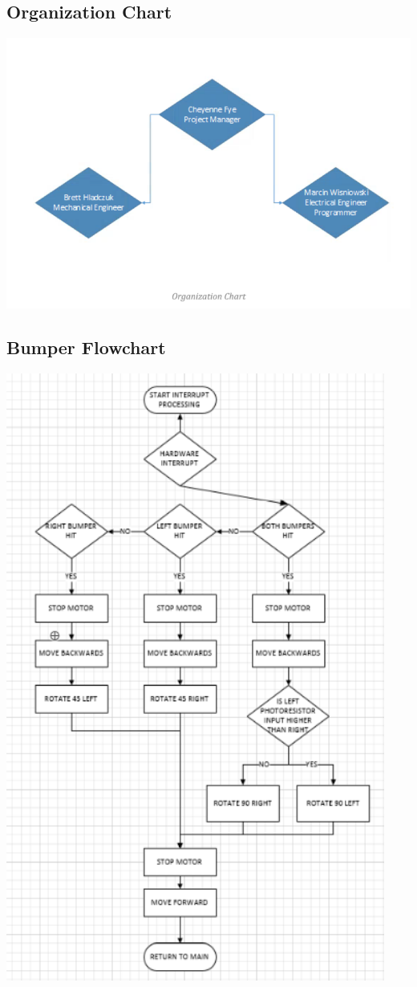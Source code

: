 \documentclass{article}
\begin{document}
\subsection{Organization Chart}
\includegraphics[width=\textwidth]{Organization_Chart.png}
\subsection{Bumper Flowchart}
\begin{center}
\includegraphics[height=20cm]{BumperFlowchart.png}
\end{center}
\end{document}
